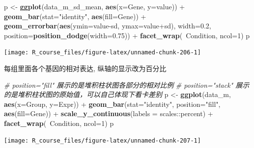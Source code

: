 \documentclass[]{article}
\newenvironment{Shaded}{\begin{snugshade}}{\end{snugshade}}
\newcommand{\KeywordTok}[1]{\textcolor[rgb]{0.13,0.29,0.53}{\textbf{{#1}}}}
\newcommand{\DataTypeTok}[1]{\textcolor[rgb]{0.13,0.29,0.53}{{#1}}}
\newcommand{\DecValTok}[1]{\textcolor[rgb]{0.00,0.00,0.81}{{#1}}}
\newcommand{\FloatTok}[1]{\textcolor[rgb]{0.00,0.00,0.81}{{#1}}}
\newcommand{\StringTok}[1]{\textcolor[rgb]{0.31,0.60,0.02}{{#1}}}
\newcommand{\CommentTok}[1]{\textcolor[rgb]{0.56,0.35,0.01}{\textit{{#1}}}}
\newcommand{\NormalTok}[1]{{#1}}
\numberwithin{figure}{section}
\numberwithin{table}{section}
\theoremstyle{definition}
\theoremstyle{definition}
\theoremstyle{definition}
\theoremstyle{remark}
\begin{document}
\begin{Shaded}
\begin{Highlighting}[]
\NormalTok{p <-}\StringTok{ }\KeywordTok{ggplot}\NormalTok{(data_m_sd_mean, }\KeywordTok{aes}\NormalTok{(}\DataTypeTok{x=}\NormalTok{Gene, }\DataTypeTok{y=}\NormalTok{value)) +}\StringTok{ }
\StringTok{    }\KeywordTok{geom_bar}\NormalTok{(}\DataTypeTok{stat=}\StringTok{"identity"}\NormalTok{, }\KeywordTok{aes}\NormalTok{(}\DataTypeTok{fill=}\NormalTok{Gene)) +}
\StringTok{    }\KeywordTok{geom_errorbar}\NormalTok{(}\KeywordTok{aes}\NormalTok{(}\DataTypeTok{ymin=}\NormalTok{value-sd, }\DataTypeTok{ymax=}\NormalTok{value+sd), }\DataTypeTok{width=}\FloatTok{0.2}\NormalTok{, }
            \DataTypeTok{position=}\KeywordTok{position_dodge}\NormalTok{(}\DataTypeTok{width=}\FloatTok{0.75}\NormalTok{)) +}
\StringTok{    }\KeywordTok{facet_wrap}\NormalTok{(~Condition, }\DataTypeTok{ncol=}\DecValTok{1}\NormalTok{)}
\NormalTok{p}
\end{Highlighting}
\end{Shaded}

\begin{center}\texttt{[image: R\_course\_files/figure-latex/unnamed-chunk-206-1]} \end{center}

每组里面各个基因的相对表达, 纵轴的显示改为百分比

\begin{Shaded}
\begin{Highlighting}[]
\CommentTok{# position="fill" 展示的是堆积柱状图各部分的相对比例}
\CommentTok{# position="stack" 展示的是堆积柱状图的原始值，可以自己体现下看卡差别}
\NormalTok{p <-}\StringTok{ }\KeywordTok{ggplot}\NormalTok{(data_m, }\KeywordTok{aes}\NormalTok{(}\DataTypeTok{x=}\NormalTok{Group, }\DataTypeTok{y=}\NormalTok{Expr)) +}
\StringTok{    }\KeywordTok{geom_bar}\NormalTok{(}\DataTypeTok{stat=}\StringTok{"identity"}\NormalTok{, }\DataTypeTok{position=}\StringTok{"fill"}\NormalTok{, }\KeywordTok{aes}\NormalTok{(}\DataTypeTok{fill=}\NormalTok{Gene)) +}
\StringTok{    }\KeywordTok{scale_y_continuous}\NormalTok{(}\DataTypeTok{labels =} \NormalTok{scales::percent) +}
\StringTok{    }\KeywordTok{facet_wrap}\NormalTok{(~Condition, }\DataTypeTok{ncol=}\DecValTok{1}\NormalTok{)}
\NormalTok{p}
\end{Highlighting}
\end{Shaded}

\begin{center}\texttt{[image: R\_course\_files/figure-latex/unnamed-chunk-207-1]} \end{center}
\end{document}
